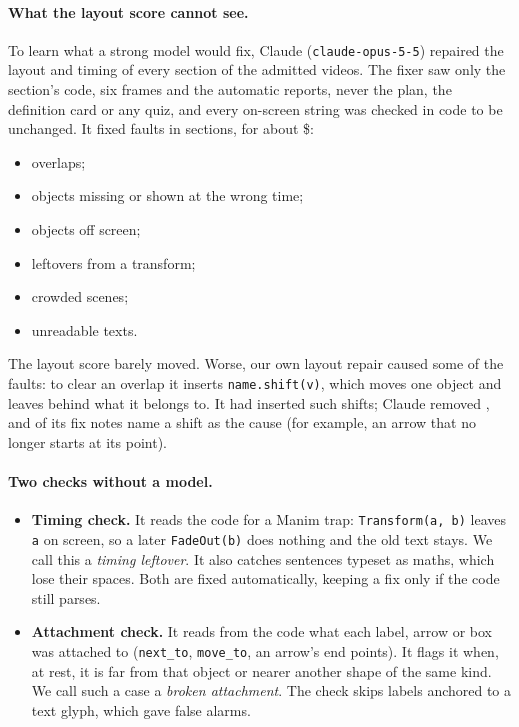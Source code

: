 \documentclass[11pt]{article}
\begin{document}
\paragraph{What the layout score cannot see.} To learn what a strong model would fix, Claude
(\texttt{claude-opus-5-5}) repaired the layout and timing of every section of the \AdmComplete{} admitted videos. The
fixer saw only the section's code, six frames and the automatic reports, never the plan, the definition card or any
quiz, and every on-screen string was checked in code to be unchanged. It fixed \ClaudeFaults{} faults in
\ClaudeSections{} sections, for about \$\ClaudeCost{}:
\begin{itemize}
  \item \ClaudeOverlap{} overlaps;
  \item \ClaudeOther{} objects missing or shown at the wrong time;
  \item \ClaudeOffScreen{} objects off screen;
  \item \ClaudeLeftover{} leftovers from a transform;
  \item \ClaudeCrowded{} crowded scenes;
  \item \ClaudeUnreadable{} unreadable texts.
\end{itemize}
The layout score barely moved. Worse, our own layout repair caused some of the faults: to clear an overlap it
inserts \texttt{name.shift(v)}, which moves one object and leaves behind what it belongs to. It had inserted
\ShiftsIn{} such shifts; Claude removed \ShiftsRemoved{}, and \ShiftNotes{} of its fix notes name a shift as the
cause (for example, an arrow that no longer starts at its point).

\paragraph{Two checks without a model.}
\begin{itemize}
  \item \textbf{Timing check.} It reads the code for a Manim trap: \texttt{Transform(a, b)} leaves \texttt{a} on
  screen, so a later \texttt{FadeOut(b)} does nothing and the old text stays. We call this a \emph{timing
  leftover}. It also catches sentences typeset as
  maths, which lose their spaces. Both are fixed automatically, keeping a fix only if the code still parses.
  \item \textbf{Attachment check.} It reads from the code what each label, arrow or box was attached to
  (\texttt{next\_to}, \texttt{move\_to}, an arrow's end points). It flags it when, at rest, it is far from that object
  or nearer another shape of the same kind. We call such a case a \emph{broken attachment}. The check skips labels
  anchored to a text glyph, which gave false alarms.
\end{itemize}
\end{document}
